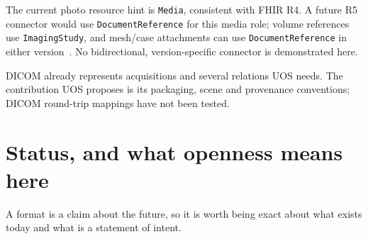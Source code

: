 \documentclass[11pt,a4paper]{article}
\newcommand{\code}[1]{\texttt{\small #1}}
\begin{document}
The current photo resource hint is \code{Media}, consistent with FHIR R4. A future R5
connector would use \code{DocumentReference} for this media role; volume references use
\code{ImagingStudy}, and mesh/case attachments can use \code{DocumentReference} in either
version~\cite{fhir}. No bidirectional, version-specific connector is demonstrated here.

DICOM already represents acquisitions and several relations UOS needs. The contribution UOS
proposes is its packaging, scene and provenance conventions; DICOM round-trip mappings have
not been tested.


\section{Status, and what openness means here}\label{sec:status}

A format is a claim about the future, so it is worth being exact about what exists today and
what is a statement of intent.
\end{document}
